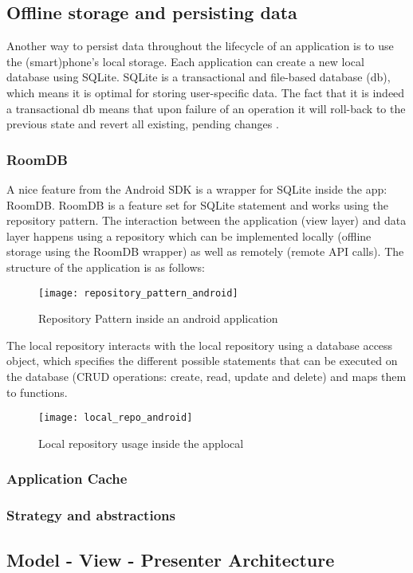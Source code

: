 \subsection{Offline storage and persisting data}
Another way to persist data throughout the lifecycle of an application is to use the (smart)phone's local storage. Each application can create a new local database using SQLite. SQLite is a transactional and file-based database (db), which means it is optimal for storing user-specific data. The fact that it is indeed a transactional db means that upon failure of an operation it will roll-back to the previous state and revert all existing, pending changes \cite{TutorialsPoint2019}.
\subsubsection{RoomDB}
A nice feature from the Android SDK is a wrapper for SQLite inside the app: RoomDB. RoomDB is a feature set for SQLite statement and works using the repository pattern. The interaction between the application (view layer) and data layer happens using a repository which can be implemented locally (offline storage using the RoomDB wrapper) as well as remotely (remote API calls). The structure of the application is as follows:
\begin{figure}[h!]
\texttt{[image: repository\_pattern\_android]}
\centering
\caption{Repository Pattern inside an android application~\cite{EslamHussein2018}}
\end{figure}
The local repository interacts with the local repository using a database access object, which specifies the different possible statements that can be executed on the database (CRUD operations: create, read, update and delete) and maps them to functions.
\begin{figure}[h!]
\texttt{[image: local\_repo\_android]}
\centering
\caption{Local repository usage inside the applocal~\cite{Unknown2018}}
\end{figure}

\subsubsection{Application Cache}
\subsubsection{Strategy and abstractions}
\subsection{Model - View - Presenter Architecture}
